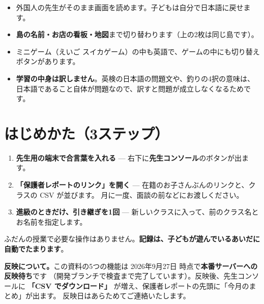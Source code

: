 \documentclass[a4paper,10.5pt]{article}
\newcommand{\hl}[1]{\textbf{\color{uspeakGreen}#1}}
\begin{document}
\vspace{6pt}

\begin{itemize}[leftmargin=1.2em,itemsep=1pt]
  \item 外国人の先生がそのまま画面を読めます。子どもは自分で日本語に戻せます。
  \item \hl{島の名前・お店の看板・地図}まで切り替わります（上の2枚は同じ島です）。
  \item ミニゲーム（えいご スイカゲーム）の中も英語で、ゲームの中にも切り替えボタンがあります。
  \item \hl{学習の中身は訳しません}。英検の日本語の問題文や、釣りの4択の意味は、
        日本語であること自体が問題なので、訳すと問題が成立しなくなるためです。
\end{itemize}

\section{はじめかた（3ステップ）}

\begin{enumerate}[leftmargin=1.4em,itemsep=3pt]
  \item \hl{先生用の端末で合言葉を入れる} — 右下に\hl{先生コンソール}のボタンが出ます。
  \item \hl{「保護者レポートのリンク」を開く} — 在籍のお子さんぶんのリンクと、クラスの CSV が並びます。
        月に一度、面談の前などにお渡しください。
  \item \hl{進級のときだけ、引き継ぎを1回} — 新しいクラスに入って、前のクラス名とお名前を指定します。
\end{enumerate}

ふだんの授業で必要な操作はありません。\hl{記録は、子どもが遊んでいるあいだに自動でたまります}。

\begin{caution}
\hl{反映について。}この資料の5つの機能は 2026年9月27日 時点で\hl{本番サーバーへの反映待ち}です
（開発ブランチで検査まで完了しています）。反映後、先生コンソールに
\hl{「CSV でダウンロード」} が増え、保護者レポートの先頭に「今月のまとめ」が出ます。
反映日はあらためてご連絡いたします。
\end{caution}

\vspace{6pt}

\begin{center}
\end{center}
\end{document}
